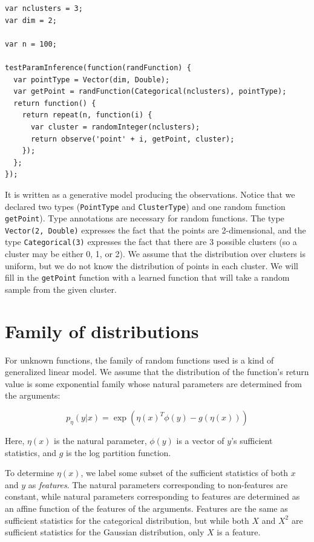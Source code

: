 \documentclass{article}
\begin{document}
  \begin{verbatim}
var nclusters = 3;
var dim = 2;

var n = 100;

testParamInference(function(randFunction) {
  var pointType = Vector(dim, Double);
  var getPoint = randFunction(Categorical(nclusters), pointType);
  return function() {
    return repeat(n, function(i) {
      var cluster = randomInteger(nclusters);
      return observe('point' + i, getPoint, cluster);
    });
  };
});
  \end{verbatim}

  It is written as a generative model producing the observations.  Notice that we declared two types (\texttt{PointType} and \texttt{ClusterType})
  and one random function \texttt{getPoint}).
  Type annotations are necessary for random functions.  The type
  \texttt{Vector(2, Double)} expresses the fact that the points are 2-dimensional,
  and the type \texttt{Categorical(3)} expresses the fact that there are 3
  possible clusters (so a cluster may be either 0, 1, or 2).  We assume that
  the distribution over clusters is uniform, but we do not know the distribution
  of points in each cluster.
  We will fill in the
  \texttt{getPoint} function with a learned function that will take a random
  sample from the given cluster.

  \section{Family of distributions}
  
  For unknown functions, the family of random functions used is a kind
    of generalized linear model.  We assume that the distribution
    of the function's return value
    is some exponential family whose natural
    parameters are determined from the arguments:

    $$p_{\eta}(y | x) = \exp\left(\eta(x)^T \phi(y) - g(\eta(x))\right)$$

    Here, $\eta(x)$ is the natural parameter, $\phi(y)$ is a vector of $y$'s sufficient statistics,
    and $g$ is the log partition function.

    To determine $\eta(x)$, we label
    some subset of the sufficient statistics of both $x$ and $y$ as \emph{features}.  The natural
    parameters corresponding to non-features are constant, while natural
    parameters corresponding to features are determined as an affine
    function of the features of the arguments.  Features are the same as sufficient
    statistics for the categorical distribution, but while both $X$ and $X^2$ are
    sufficient statistics for the Gaussian distribution, only $X$ is a feature.
\end{document}
